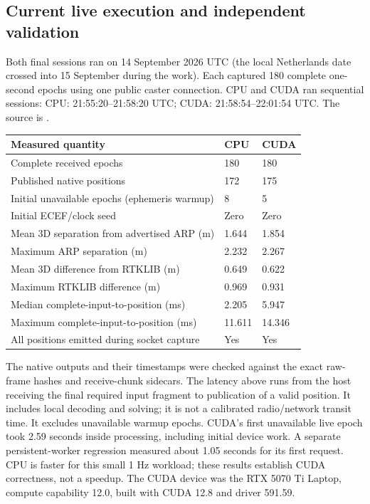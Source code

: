 \clearpage
\subsection{Current live execution and independent validation}
\label{sec:live-validation}
Both final sessions ran on 14 September 2026 UTC (the local Netherlands date
crossed into 15 September during the work). Each captured 180 complete one-second
epochs using one public caster connection. CPU and CUDA ran sequential sessions:
CPU: 21:55:20--21:58:20 UTC; CUDA: 21:58:54--22:01:54 UTC. The source is .
\begin{center}
\begin{tabularx}{\textwidth}{@{}P{.61\textwidth}YY@{}}\toprule
\textbf{Measured quantity} & \textbf{CPU} & \textbf{CUDA}\\\midrule
Complete received epochs & 180 & 180\\
Published native positions & 172 & 175\\
Initial unavailable epochs (ephemeris warmup) & 8 & 5\\
Initial ECEF/clock seed & Zero & Zero\\
Mean 3D separation from advertised ARP (m) & 1.644 & 1.854\\
Maximum ARP separation (m) & 2.232 & 2.267\\
Mean 3D difference from RTKLIB (m) & 0.649 & 0.622\\
Maximum RTKLIB difference (m) & 0.969 & 0.931\\
Median complete-input-to-position (ms) & 2.205 & 5.947\\
Maximum complete-input-to-position (ms) & 11.611 & 14.346\\
All positions emitted during socket capture & Yes & Yes\\\bottomrule
\end{tabularx}
\end{center}
The native outputs and their timestamps were checked against the exact raw-frame
hashes and receive-chunk sidecars. The latency above runs from the host receiving
the final required input fragment to publication of a valid position. It includes
local decoding and solving; it is not a calibrated radio/network transit time.
It excludes unavailable warmup epochs. CUDA's first unavailable live epoch took
2.59 seconds inside processing, including initial device work. A separate
persistent-worker regression measured about 1.05 seconds for its first request.
CPU is faster for this small 1 Hz workload; these results establish CUDA correctness,
not a speedup. The CUDA device was the RTX 5070 Ti Laptop, compute capability 12.0,
built with CUDA 12.8 and driver 591.59.

